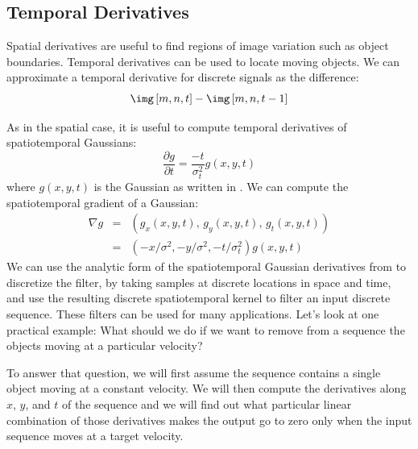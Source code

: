 \subsection{Temporal Derivatives}


Spatial derivatives are useful to find regions of image variation such as object boundaries. Temporal derivatives can be used to locate moving objects. We can approximate a temporal derivative for discrete signals as the difference:
\begin{equation}
\img \left[m,n,t\right] - \img \left[m,n,t-1\right] 
\end{equation}


As in the spatial case, it is useful to compute temporal derivatives of spatiotemporal Gaussians:
\begin{equation}
\frac{\partial g}{\partial t} = \frac{-t}{\sigma_t^2} g(x,y,t)
\end{equation}
where $g(x,y,t)$ is the Gaussian as written in \eqn{\ref{eq:gauss3dcont}}. We can compute the spatiotemporal gradient of a Gaussian:
\begin{eqnarray}
\nabla  g &=& \left( g_x(x,y,t), \, g_y(x,y,t), \, g_t(x,y,t) \right) \nonumber \\
 &=&  \left(-x/\sigma^2, -y/\sigma^2, -t/\sigma_t^2 \right) g(x,y,t)
 \label{eq:spt_gradient_gaussian}
\end{eqnarray}
We can use the analytic form of the spatiotemporal Gaussian derivatives from \eqn{\ref{eq:spt_gradient_gaussian}} to discretize the filter, by taking samples at discrete locations in space and time, and use the resulting discrete spatiotemporal kernel to filter an input discrete sequence. These filters can be used for many applications. Let's look at one practical example: What should we do if we want to remove from a sequence the objects moving at a particular velocity? 

To answer that question, we will first assume the sequence contains a single object moving at a constant velocity. We will then compute the  derivatives along $x$, $y$, and $t$ of the sequence and we will find out what particular linear combination of those derivatives makes the output go to zero only when the input sequence moves at a target velocity.

